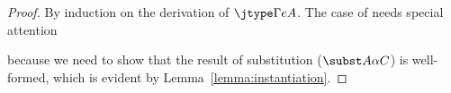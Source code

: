 \wellformedtyping*

\begin{proof}
  By induction on the derivation of $\jtype \Gamma e A$. The case of  needs special attention
  \begin{mathpar}
  \end{mathpar}
  because we need to show that the result of substitution ($\subst A \alpha C$) is well-formed, which is evident by Lemma~\ref{lemma:instantiation}.
\end{proof}


%

%

\uniquecoercion*

